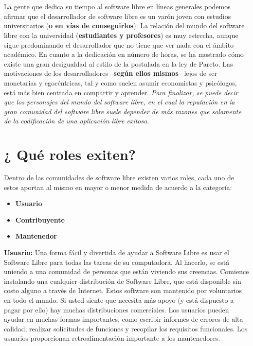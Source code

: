 \\
\\
La gente que dedica su tiempo al software libre en líneas generales podemos afirmar que el desarrollador de software libre es un varón joven con estudios universitarios ({\bf o en vías de conseguirlos}). La relación del mundo del software libre con la universidad ({\bf estudiantes y profesores}) es muy estrecha, aunque sigue predominando el desarrollador que no tiene que ver nada con el ámbito académico. En cuanto a la dedicación en número de horas, se ha mostrado cómo existe una gran desigualdad al estilo de la postulada en la ley de Pareto. 
Las motivaciones de los desarrolladores –{\bf según ellos mismos}– lejos de ser monetarias y egocéntricas, tal y como suelen asumir economistas y psicólogos, está más bien centrada en compartir y aprender. \emph{Para finalizar, se puede decir que los personajes del mundo del software libre, en el cual la reputación en la gran comunidad del software libre suele depender de más razones que solamente de la codificación de una aplicación libre exitosa}.


\section{¿ Qué roles exiten?}

Dentro de las comunidades de software libre existen varios roles, cada uno de estos aportan al mismo en mayor o menor medida de acuerdo a la categoría:
\begin{itemize}
     \item \textbf{Usuario}
     \item \textbf{Contribuyente}
     \item \textbf{Mantenedor}
\end{itemize}

\textbf{Usuario:} Una forma fácil y divertida de ayudar a Software Libre es usar el Software Libre para todas las tareas de su computadora. Al hacerlo, se está uniendo a una comunidad de personas que están viviendo sus creencias. Comience instalando una cualquier distribución de Software Libre, que está disponible sin costo alguno a través de Internet. Estos software son mantenido por voluntarios en todo el mundo. Si usted siente que necesita más apoyo (y está dispuesto a pagar por ello) hay muchas distribuciones comerciales. Los usuarios pueden ayudar en muchas formas importantes, como escribir informes de errores de alta calidad, realizar solicitudes de funciones y recopilar los requisitos funcionales. Los usuarios proporcionan retroalimentación importante a los mantenedores.

